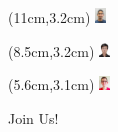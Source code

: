 \documentclass[aspectratio=43]{beamer}
\begin{document}
\begin{frame}
\begin{figure}
\begin{textblock*}{0.5cm}
    \end{textblock*}
    \begin{textblock*}{0.3cm}(11cm,3.2cm) 
      \includegraphics[width=0.3cm]{pascalElahi.jpeg}
    \end{textblock*}
    \begin{textblock*}{0.3cm}(8.5cm,3.2cm) 
      \includegraphics[width=0.3cm]{wangyang.jpg}
    \end{textblock*}
    \begin{textblock*}{0.3cm}(5.6cm,3.1cm) 
      \includegraphics[width=0.3cm]{JakeArthur.png}
    \end{textblock*}
    \caption{Join Us!}
  \end{figure}
\end{frame}
\end{document}
